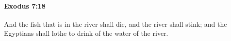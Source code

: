 
		\paragraph{Exodus 7:18} %
			\label{EXODUS-7-18}

			And the fish that is in the river shall die, and the river shall stink; and the Egyptians shall lothe to drink of the water of the river.


